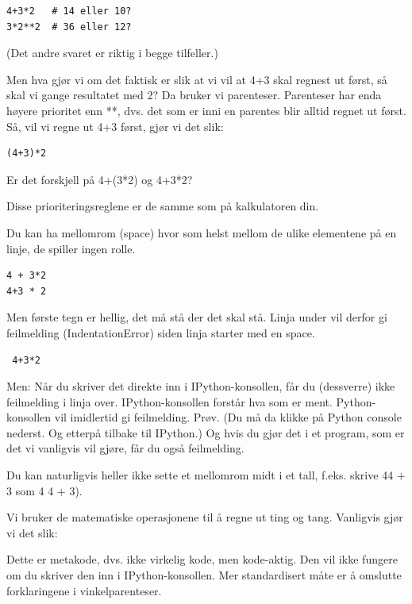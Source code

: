 {\begin{lstlisting}
4+3*2   # 14 eller 10? 
3*2**2  # 36 eller 12?
\end{lstlisting}

(Det andre svaret er riktig i begge tilfeller.)

Men hva gjør vi om det faktisk er slik at vi vil at 4+3 skal regnest ut først, så skal vi gange resultatet med 2? Da bruker vi parenteser. Parenteser har enda høyere prioritet enn **, dvs. det som er inni en parentes blir alltid regnet ut først. Så, vil vi regne ut 4+3 først, gjør vi det slik: 
\begin{lstlisting}
(4+3)*2
\end{lstlisting}

Er det forskjell på 4+(3*2) og 4+3*2? 

Disse prioriteringsreglene er de samme som på kalkulatoren din. 

Du kan ha mellomrom (space) hvor som helst mellom de ulike elementene på en linje, de spiller ingen rolle.

\begin{lstlisting}
4 + 3*2
4+3 * 2 
\end{lstlisting}

Men første tegn er hellig, det må stå der det skal stå. Linja under vil derfor gi feilmelding (IndentationError) siden linja starter med en space.
\begin{lstlisting}
 4+3*2
\end{lstlisting}

Men: Når du skriver det direkte inn i IPython-konsollen, får du (dessverre) ikke feilmelding i linja over. IPython-konsollen forstår hva som er ment. Python-konsollen vil imidlertid gi feilmelding. Prøv. (Du må da klikke på Python console nederst. Og etterpå tilbake til IPython.) Og hvis du gjør det i et program, som er det vi vanligvis vil gjøre, får du også feilmelding. 

Du kan naturligvis heller ikke sette et mellomrom midt i et tall, f.eks. skrive 44 + 3 som 4 4 + 3). 

Vi bruker de matematiske operasjonene til å regne ut ting og tang. Vanligvis gjør vi det slik:


Dette er metakode, dvs. ikke virkelig kode, men kode-aktig. Den vil ikke fungere om du skriver den inn i IPython-konsollen. Mer standardisert måte er å omslutte forklaringene i vinkelparenteser.


}
